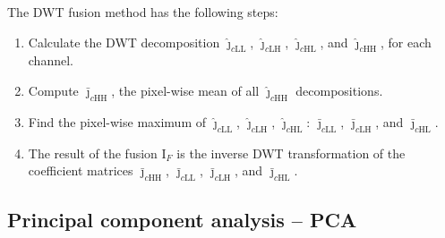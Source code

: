 \documentclass[journal]{IEEEtran}
\begin{document}
The DWT fusion method has the following steps:
\begin{enumerate}
\item Calculate the DWT decomposition $\bm{\widehat\jmath}_{c\text{LL}}$, $\bm{\widehat\jmath}_{c\text{LH}}$, $\bm{\widehat\jmath}_{c\text{HL}}$, and $\bm{\widehat\jmath}_{c\text{HH}}$, for each channel.
\item Compute $\bm{\bar\jmath}_{c\text{HH}}$, the pixel-wise mean of all $\bm{\widehat\jmath}_{c\text{HH}}$ decompositions.
\item Find the pixel-wise maximum of $\bm{\widehat\jmath}_{c\text{LL}}$, $\bm{\widehat\jmath}_{c\text{LH}}$, $\bm{\widehat\jmath}_{c\text{HL}}$: $\bm{\bar\jmath}_{c\text{LL}}$, $\bm{\bar\jmath}_{c\text{LH}}$, and $\bm{\bar\jmath}_{c\text{HL}}$.
\item The result of the fusion $\text{I}_F$ is the inverse DWT transformation of the coefficient matrices $\bm{\bar\jmath}_{c\text{HH}}$, $\bm{\bar\jmath}_{c\text{LL}}$, $\bm{\bar\jmath}_{c\text{LH}}$, and $\bm{\bar\jmath}_{c\text{HL}}$.
\end{enumerate}
\subsection{Principal component analysis -- PCA}
\end{document}
